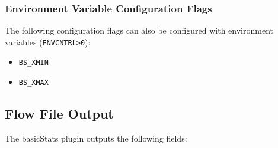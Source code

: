 \documentclass[documentation]{subfiles}
\begin{document}
\subsubsection{Environment Variable Configuration Flags}
The following configuration flags can also be configured with environment variables ({\tt ENVCNTRL>0}):
\begin{itemize}
    \item {\tt BS\_XMIN}
    \item {\tt BS\_XMAX}
\end{itemize}

\clearpage
\subsection{Flow File Output}
The basicStats plugin outputs the following fields:
\end{document}
